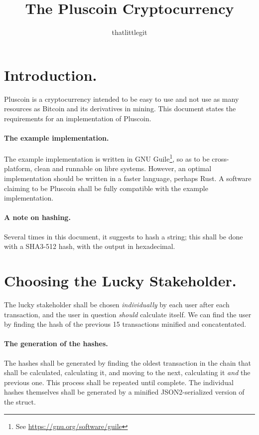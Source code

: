 \documentclass{article}
\title{The Pluscoin Cryptocurrency}
\author{thatlittlegit}
\date{}
\begin{document}
\maketitle
\tableofcontents
\newpage
{}

\section{Introduction.}
Pluscoin is a cryptocurrency intended to be easy to use and not use as many
resources as Bitcoin and its derivatives in mining. This document states the
requirements for an implementation of Pluscoin.

\paragraph{The example implementation.} The example implementation is written
in GNU Guile\footnote{See \url{https://gnu.org/software/guile}}, so as to be
cross-platform, clean and runnable on libre systems. However, an optimal
implementation should be written in a faster language, perhaps Rust. A software
claiming to be Pluscoin shall be fully compatible with the example
implementation.

\paragraph{A note on hashing.} Several times in this document, it suggests to
hash a string; this shall be done with a SHA3-512 hash, with the output in
hexadecimal.

\section{Choosing the Lucky Stakeholder.}
The lucky stakeholder shall be chosen {\it{individually}} by each user after
each transaction, and the user in question {\it{should}} calculate itself. We
can find the user by finding the hash of the previous 15 transactions
minified and concatentated.

\paragraph{The generation of the hashes.} The hashes shall be generated
by finding the oldest transaction in the chain that shall be calculated,
calculating it, and moving to the next, calculating it {\it{and}} the previous
one. This process shall be repeated until complete. The individual hashes
themselves shall be generated by a minified JSON2-serialized version of the
struct.
\end{document}
